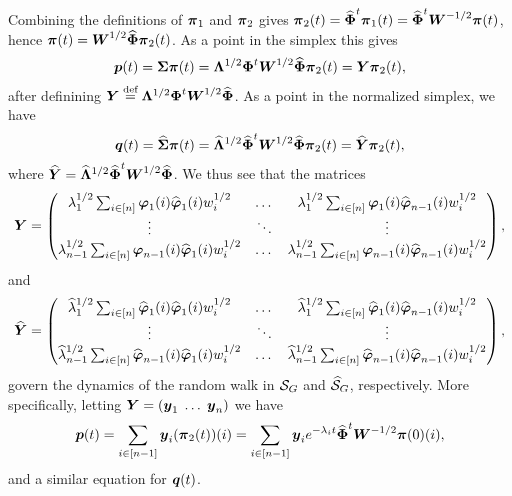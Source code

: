 Combining the  definitions of $\bpi_1$  and $\bpi_2$ gives $\bpi_2(t)  = \Eign^\tp \bpi_1(t) = \Eign^\tp \W^{-1/2}\bpi(t)$, hence 
$\bpi(t) = \W^{1/2} \Eign \bpi_2(t)$. As a point in the  simplex this gives 
\begin{equation*}
\p(t)  = \Sv\bpi(t) = \Eval^{1/2}\Eig^\tp \W^{1/2}\Eign \bpi_2(t) = \Y\bpi_2(t),
\end{equation*}
after definining $\Y\equiv \Eval^{1/2}\Eig^\tp \W^{1/2}\Eign$. As a point in the normalized simplex, we have 
\begin{equation*}
\q(t) = \Svn\bpi(t) = \Evaln^{1/2}\Eign^\tp\W^{1/2}\Eign\bpi_2(t) = \Yn\bpi_2(t),
\end{equation*}
where $\Yn= \Evaln^{1/2}\Eign^\tp\W^{1/2}\Eign$. We thus  see that the matrices 
\begin{equation*}
\Y = \begin{pmatrix}
\lambda_1^{1/2}\sum_{i\in[n]} \vp_1(i)\vpn_1(i) w_i^{1/2} & \dots &  \lambda_1^{1/2}\sum_{i\in[n]} \vp_1(i)\vpn_{n-1}(i) w_i^{1/2} \\
\vdots & \ddots & \vdots \\
\lambda_{n-1}^{1/2}\sum_{i\in[n]} \vp_{n-1}(i)\vpn_1(i) w_i^{1/2} & \dots &  \lambda_{n-1}^{1/2}\sum_{i\in[n]} \vp_{n-1}(i)\vpn_{n-1}(i) w_i^{1/2} 
\end{pmatrix},
\end{equation*}
and  
\begin{equation*}
\Yn  = \begin{pmatrix}
\lambdan_1^{1/2}\sum_{i\in[n]} \vpn_1(i)\vpn_1(i) w_i^{1/2} & \dots &  \lambdan_1^{1/2}\sum_{i\in[n]} \vpn_1(i)\vpn_{n-1}(i) w_i^{1/2} \\
\vdots & \ddots & \vdots \\
\lambdan_{n-1}^{1/2}\sum_{i\in[n]} \vpn_{n-1}(i)\vpn_1(i) w_i^{1/2} & \dots &  \lambdan_{n-1}^{1/2}\sum_{i\in[n]} \vpn_{n-1}(i)\vpn_{n-1}(i) w_i^{1/2} 
\end{pmatrix},
\end{equation*}
govern the dynamics of the random walk in  $\splx_G$ and $\splxn_G$, respectively.  More specifically, letting $\Y=(\y_1\;\dots\;\y_n)$ we have 
\[\p(t) = \sum_{i\in[n-1]} \y_i (\bpi_2(t))(i) = \sum_{i\in[n-1]}  \y_i e^{-\lambda_i t} \Eign^\tp \W^{-1/2}\bpi(0)(i),\]
and a similar  equation for $\q(t)$.  






